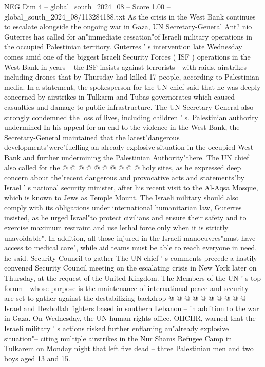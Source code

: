 \begin{textsample}{NEG Dim 4 – global\_south\_2024\_08 – Score 1.00 – global\_south\_2024\_08/113284188.txt}  \label{ex:f4_neg_338}
As the crisis in the West Bank continues to escalate alongside the ongoing war in Gaza, UN Secretary-General Ant? nio Guterres has called for an"immediate cessation"of Israeli military operations in the occupied Palestinian territory.
Guterres ' s intervention late Wednesday comes amid one of the biggest Israeli Security Forces ( ISF ) operations in the West Bank in years -- the ISF insists against terrorists - with raids, airstrikes including drones that by Thursday had killed 17 people, according to Palestinian media.
In a statement, the spokesperson for the UN chief said that he was deeply concerned by airstrikes in Tulkarm and Tubas governorates which caused casualties and damage to public infrastructure.
The UN Secretary-General also strongly condemned the loss of lives, including children ' s.
Palestinian authority undermined In his appeal for an end to the violence in the West Bank, the Secretary-General maintained that the latest"dangerous developments"were"fuelling an already explosive situation in the occupied West Bank and further undermining the Palestinian Authority"there.
The UN chief also called for the @ @ @ @ @ @ @ @ @ @ holy sites, as he expressed deep concern about the"recent dangerous and provocative acts and statements"by Israel ' s national security minister, after his recent visit to the Al-Aqsa Mosque, which is known to Jews as Temple Mount.
The Israeli military should also comply with its obligations under international humanitarian law, Guterres insisted, as he urged Israel"to protect civilians and ensure their safety and to exercise maximum restraint and use lethal force only when it is strictly unavoidable".
In addition, all those injured in the Israeli manoeuvres"must have access to medical care", while aid teams must be able to reach everyone in need, he said.
Security Council to gather The UN chief ' s comments precede a hastily convened Security Council meeting on the escalating crisis in New York later on Thursday, at the request of the United Kingdom.
The Members of the UN ' s top forum - whose purpose is the maintenance of international peace and security -- are set to gather against the destabilizing backdrop @ @ @ @ @ @ @ @ @ @ Israel and Hezbollah fighters based in southern Lebanon -- in addition to the war in Gaza.
On Wednesday, the UN human rights office, OHCHR, warned that the Israeli military ' s actions risked further enflaming an"already explosive situation"-- citing multiple airstrikes in the Nur Shams Refugee Camp in Tulkarem on Monday night that left five dead -- three Palestinian men and two boys aged 13 and 15.

\end{textsample}
